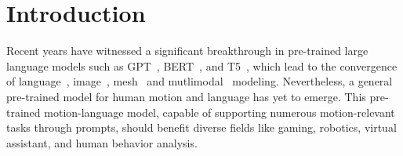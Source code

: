 
\section{Introduction}
\label{intro}

Recent years have witnessed a significant breakthrough in pre-trained large language models such as GPT~\cite{radford2018gpt,radford2019gpt2,brown2020gpt3,ouyang2022instructgpt}, BERT~\cite{devlin2018bert}, and T5~\cite{raffel2020t5,chung2022flant5}, which lead to the convergence of language~\cite{zhang2022opt,touvron2023llama}, image~\cite{radford2021clip,wang2022beit,li2022blip}, mesh~\cite{youwang2022clipactor,mohammad2022clipmesh} and mutlimodal~\cite{girdhar2023imagebind} modeling. Nevertheless, a general pre-trained model for human motion and language has yet to emerge. This pre-trained motion-language model, capable of supporting numerous motion-relevant tasks through prompts, should benefit diverse fields like gaming, robotics, virtual assistant, and human behavior analysis.


